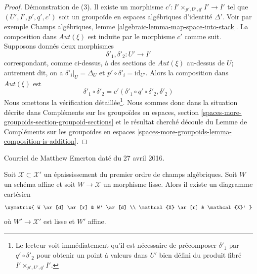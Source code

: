 \begin{proof}
\medskip\noindent
Démonstration de (3). Il existe un morphisme $c' : I' \times_{p', U', q'} I' \to I'$
tel que $(U', I', p', q', c')$ soit un groupoïde en espaces algébriques
d'identité $\Delta'$. Voir par exemple
Champs algébriques, lemme \ref{algebraic-lemma-map-space-into-stack}.
La composition dans $\mathit{Aut}(\xi)$ est induite par le morphisme
$c'$ comme suit. Supposons donnés deux morphismes
$$
\delta'_1, \delta'_2 : U' \longrightarrow I'
$$
correspondant, comme ci-dessus, à des sections de $\mathit{Aut}(\xi)$ au-dessus de $U$;
autrement dit, on a $\delta'_i|_U = \Delta_U$ et
$p' \circ \delta'_i = \text{id}_{U'}$. Alors la composition
dans $\mathit{Aut}(\xi)$ est
$$
\delta'_1 \circ \delta'_2 = c'(\delta'_1 \circ q' \circ \delta'_2, \delta'_2)
$$
Nous omettons la vérification détaillée\footnote{Le lecteur voit immédiatement
qu'il est nécessaire de précomposer
$\delta'_1$ par $q' \circ \delta'_2$ pour obtenir un point à valeurs dans $U'$
bien défini du produit fibré $I' \times_{p', U', q'} I'$.}.
Nous sommes donc dans la situation décrite dans
Compléments sur les groupoïdes en espaces, section
\ref{spaces-more-groupoids-section-groupoid-sections}
et le résultat cherché découle du
Lemme de Compléments sur les groupoïdes en espaces
\ref{spaces-more-groupoids-lemma-composition-is-addition}.
\end{proof}

\begin{proposition}[Emerton]
\label{proposition-affine-smooth-lift-to-first-order}
\begin{reference}
Courriel de Matthew Emerton daté du 27 avril 2016.
\end{reference}
Soit $\mathcal{X} \subset \mathcal{X}'$ un épaississement du premier ordre
de champs algébriques. Soit $W$ un schéma affine et soit
$W \to \mathcal{X}$ un morphisme lisse. Alors il existe
un diagramme cartésien
$$
\xymatrix{
W \ar[d] \ar[r] & W' \ar[d] \\
\mathcal{X} \ar[r] & \mathcal{X}'
}
$$
où $W' \to \mathcal{X}'$ est lisse et $W'$ affine.
\end{proposition}

